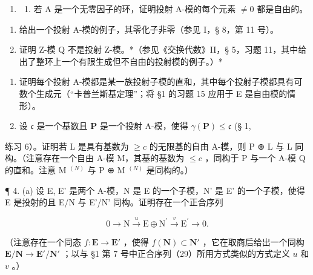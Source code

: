 \BourbakiExercisesSection

\begin{enumerate}
\def\labelenumi{\arabic{enumi}.}
\tightlist
\item
  \begin{enumerate}
  \def\labelenumii{(\alph{enumii})}
  \tightlist
  \item
    若 A 是一个无零因子的环，证明投射 A-模的每个元素 \(\neq0\) 都是自由的。
  \end{enumerate}
\end{enumerate}

\begin{enumerate}
\def\labelenumi{(\alph{enumi})}
\setcounter{enumi}{1}
\item
  给出一个投射 A-模的例子，其零化子非零（参见 I，§ 8，第 11 号）。
\item
  证明 Z-模 Q 不是投射 Z-模。*（参见《交换代数》II，§ 5，习题 11，其中给出了整环上一个有限生成但不自由的投射模的例子。）*
\end{enumerate}

\begin{enumerate}
\def\labelenumi{\arabic{enumi}.}
\setcounter{enumi}{1}
\item
  证明每个投射 A-模都是某一族投射子模的直和，其中每个投射子模都具有可数个生成元（“卡普兰斯基定理”；将 §1 的习题 15 应用于 E 是自由模的情形）。
\item
  设 \(\mathfrak{c}\) 是一个基数且 \(\mathbf{P}\) 是一个投射 A-模，使得 \(\gamma(\mathbf{P}) \leqslant \mathfrak{c}\) (§ 1,
\end{enumerate}

练习 6）。证明若 L 是具有基数为 \(\geqslant c\) 的无限基的自由 A-模，则 P ⊕ L 与 L 同构。（注意存在一个自由 A-模 M，其基的基数为 \(\leqslant c\) ，同构于 P 与一个 A-模 Q 的直和。注意 M \(^{(N)}\) 与 P ⊕ M \(^{(N)}\) 是同构的。）

¶ 4. (a) 设 E, E' 是两个 A-模，N 是 E 的一个子模，N' 是 E' 的一个子模，使得 E 是投射的且 E/N 与 E'/N' 同构。证明存在一个正合序列

\[
0 \longrightarrow \mathrm{N} \stackrel {u} {\longrightarrow} \mathrm{E} \oplus \mathrm{N} ^ {\prime} \stackrel {v} {\longrightarrow} \mathrm{E} ^ {\prime} \longrightarrow 0.
\]

（注意存在一个同态 \(f \colon \mathbf{E} \to \mathbf{E}'\) ，使得 \(f(\mathbf{N}) \subset \mathbf{N}'\) ，它在取商后给出一个同构 \(\mathbf{E} / \mathbf{N} \to \mathbf{E}' / \mathbf{N}'\) ；以与 §1 第 7 号中正合序列（29）所用方式类似的方式定义 \(u\) 和 \(v\) 。）

